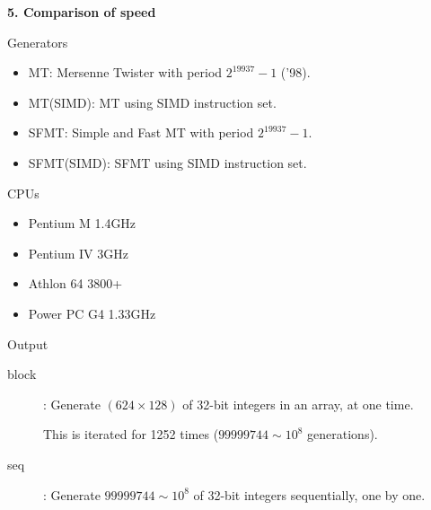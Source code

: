 \documentclass[a4j,12pt,landscape]{jarticle}
\begin{document}
\newpage
\noindent
{\bf 5. Comparison of speed}
\begin{description}
  \item Generators
    \begin{itemize}
    \item MT: Mersenne Twister with period $2^{19937}-1$ ('98).
    \item MT(SIMD): MT using SIMD instruction set.
    \item SFMT: Simple and Fast MT with period $2^{19937}-1$.
    \item SFMT(SIMD): SFMT using SIMD instruction set.
    \end{itemize}
  \item CPUs
    \begin{itemize}
      \item Pentium M 1.4GHz
      \item Pentium IV 3GHz
      \item Athlon 64 3800+
      \item Power PC G4 1.33GHz  
    \end{itemize}
    \newpage
    \item Output
      \begin{description}
      \item[block]: Generate $(624 \times 128)$ of 32-bit integers 
        in an array, at one time. 

        This is iterated for 1252 times 
        ($99999744\sim 10^8$ generations).
      \item[seq]: Generate $99999744\sim 10^8$ of 32-bit integers sequentially,
        one by one.
      \end{description}
    \end{description}
\end{document}
